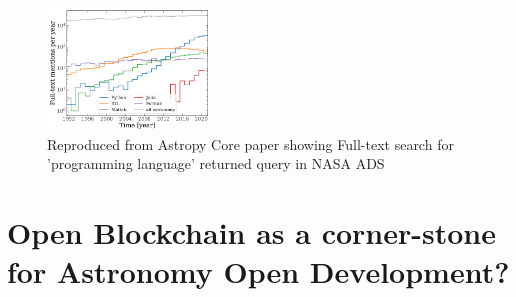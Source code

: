 \documentclass[final,5p,times,twocolumn,authoryear]{elsarticle}
\begin{document}
\begin{figure}
    \centering
    \includegraphics[width=0.38\textwidth]{figs/2206.14220.jpg}
    \vspace*{-0.3cm}
    \caption{Reproduced from Astropy Core paper showing Full-text search for 'programming language' returned query in NASA ADS}
    \label{fig:astropy}
\end{figure}

\section{Open Blockchain as a corner-stone for Astronomy Open Development?}
\label{sec:bc_review}
\end{document}
